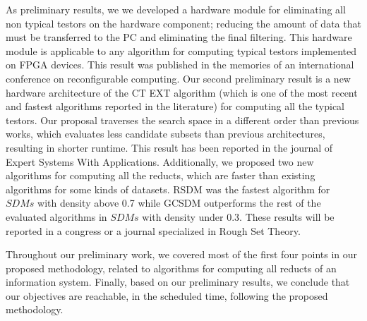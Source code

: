 \documentclass[authoryear,11pt]{elsarticle}
\begin{document}
	As preliminary results, we we developed a hardware module for eliminating all non typical testors on the
	hardware component; reducing the amount of data that must be transferred to the PC and eliminating the final
	filtering. This hardware module is applicable to any algorithm for computing typical testors implemented on
	FPGA devices. This result was published in the memories of an international conference on reconfigurable
	computing.
	Our second preliminary result is a new hardware architecture of the CT EXT algorithm (which is one of the 
	most recent and fastest algorithms reported in the literature) for computing all the typical testors. Our 
	proposal traverses the search space in a different order than previous works, which evaluates less candidate 
	subsets than previous architectures, resulting in shorter runtime. This result has been reported in the 
	journal of Expert Systems With Applications. Additionally, we proposed two new algorithms for computing all 	
	the reducts, which are faster than existing algorithms for some kinds of datasets.
	RSDM was the fastest algorithm for $SDMs$ with density above 0.7 while GCSDM outperforms the rest of the
	evaluated algorithms in $SDMs$ with density under 0.3. These results will be reported in a congress or a 
	journal specialized in Rough Set Theory.

	Throughout our preliminary work, we covered most of the first four points in our proposed methodology, related
	to algorithms for computing all reducts of an information system.
	Finally, based on our preliminary results, we conclude that our objectives are reachable, in the scheduled
	time, following 	the proposed methodology.
	
\newpage 
{}

\end{document}
